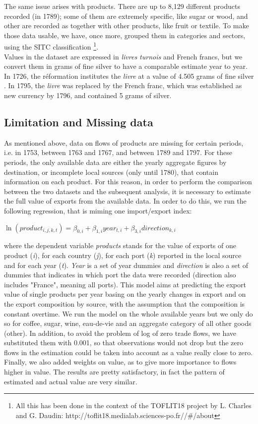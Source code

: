 \documentclass[12pt,a4paper,notitlepage,english]{article}
\begin{document}
The same issue arises with products. There are up to 8,129 different  products recorded (in 1789); some of them are extremely specific, like sugar or wood, and other are recorded as together with other products, like fruit or textile. To make those data usable, we have, once more, grouped them in categories and sectors, using the SITC classification \footnote{All this has been done in the context of the TOFLIT18 project by  L. Charles and G. Daudin: http://toflit18.medialab.sciences-po.fr//\#/about}.  \\
Values in the dataset are expressed in \textit{livres turnois} and French francs, but we convert them in grams of fine silver to have a comparable estimate year to year. In 1726, the réformation institutes the \textit{livre} at a value of 4.505 grams of fine silver \citep{de_wailly_memoire_1857}. In 1795, the \textit{livre} was replaced by the French franc, which was established as new currency by 1796, and contained 5 grams of silver. 

\subsection{Limitation and Missing data} \label{limitations}
As mentioned above, data on flows of products are missing for certain periods, i.e. in 1753, between 1763 and 1767, and between 1789 and 1797. 
For these periods, the only available data are either the yearly aggregate figures by destination, or incomplete local sources (only until 1780), that contain information on each product. For this reason, in order to perform the comparison between the two datasets and the subsequent analysis, it is necessary to estimate the full value of exports from the available data. In order to do this, we run the following regression, that is miming one import/export index:
\begin{center}
$\ln(product_{i,j,k,t})=\beta_{0,i} + \beta_{1,i}year_{t,i}+\beta_{3,i}direction_{k,i}$
\end{center}
where the dependent variable \textit{products} stands for the value of exports of one product (\textit{i}), for each country (\textit{j}), for each port (\textit{k}) reported in the local source and for each year (\textit{t}). \textit{Year} is a set of year dummies and \textit{direction} is also a set of dummies that indicates in which port the data were recorded (direction also includes "France", meaning all ports). This model aims at predicting the export value of single products per year basing on the yearly changes in export and on the export composition by source, with the assumption that the composition is constant overtime. We run the model on the whole available years but we only do so for coffee, sugar, wine, eau-de-vie and an aggregate category of all other goods (other). In addition, to avoid the problem of log of zero trade flows, we have substituted them with 0.001, so that observations would not drop but the zero flows in the estimation could be taken into account as a value really close to zero. Finally, we also added weights on value, as to give more importance to flows higher in value. The results are pretty satisfactory, in fact the pattern of estimated and actual value are very similar. 
\end{document}
